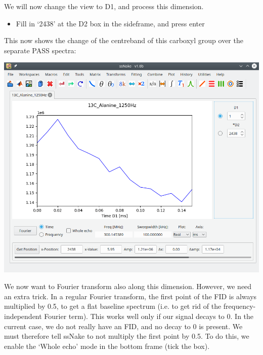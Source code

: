\documentclass[11pt,a4paper]{article}
\begin{document}
We will now change the view to D1, and process this dimension.
\begin{itemize}
  \item Fill in `2438' at the D2 box in the sideframe, and press enter
\end{itemize}
This now shows the change of the centreband of this carboxyl group over the separate PASS spectra:
\begin{center}
\includegraphics[width=0.8\linewidth]{Figs/Fig2.png}
\end{center}
We now want to Fourier transform also along this dimension. However, we need an extra trick. In a
regular Fourier transform, the first point of the FID is always multiplied by 0.5, to get a flat
baseline spectrum (i.e. to get rid of the frequency-independent Fourier term). This works well only
if our signal decays to 0. In the current case, we do not really have an FID, and no decay to 0 is
present. We must therefore tell ssNake to not multiply the first point by 0.5. To do this, we enable
the `Whole echo' mode in the bottom frame (tick the box).
\end{document}
